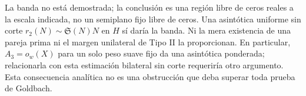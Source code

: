 \documentclass[11pt,a4paper]{article}
\newcommand{\B}[2]{#2}
\newcommand{\B}[2]{#1}
\newcommand{\Sg}{\mathfrak S}
\begin{document}
\B{The band is unproved; the conclusion is a real zero-free region at the indicated scale, not a fixed zero-free half-plane. A uniform uncut asymptotic $r_2(N)\sim\Sg(N)N$ on $H$ would give the band. Neither mere existence of a prime pair nor the one-sided Type II margin gives it. In particular $A_3=o_w(X)$ for one fixed smooth weight yields a weighted asymptotic; relating that to this uncut two-sided estimate would require an additional argument. This analytic consequence is not an obstruction that every proof of Goldbach must overcome.}{La banda no está demostrada; la conclusión es una región libre de ceros reales a la escala indicada, no un semiplano fijo libre de ceros. Una asintótica uniforme sin corte $r_2(N)\sim\Sg(N)N$ en $H$ sí daría la banda. Ni la mera existencia de una pareja prima ni el margen unilateral de Tipo II la proporcionan. En particular, $A_3=o_w(X)$ para un solo peso suave fijo da una asintótica ponderada; relacionarla con esta estimación bilateral sin corte requeriría otro argumento. Esta consecuencia analítica no es una obstrucción que deba superar toda prueba de Goldbach.}
\end{document}
